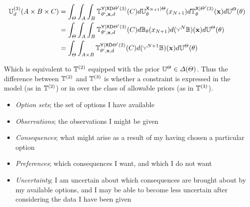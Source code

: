 \begin{align}
    \kernel{U}^{(3)}_d(A\times B\times C) &= \int_{\Theta} \int_A \int_{B}   \kernel{T}_{\theta',\mathbf{x},d}^{\RV{Y}|\RV{X}\RV{D}\Theta'(3)} (C) d\kernel{U}^{\RV{X}_{N+1}|\Theta}_\theta(x_{N+1}) d\kernel{T}_{\theta}^{\RV{X}|\Theta'(3)}(\mathbf{x}) d\kernel{U}^{\Theta}(\theta)\\
                                  &= \int_{\Theta} \int_A \int_{B}  \kernel{T}_{\theta',\mathbf{x},d}^{\RV{Y}|\RV{X}\RV{D}\Theta'(3)} (C) d\kernel{B}_\theta(x_{N+1}) d\kernel(\splitter{0.1}^{N}\kernel{B})(\mathbf{x}) d\kernel{U}^{\Theta}(\theta)\\
                                  &= \int_{\Theta} \int_{A\times B}  \kernel{T}_{\theta',\mathbf{x},d}^{\RV{Y}|\RV{X}\RV{D}\Theta'(2)} (C) d\kernel(\splitter{0.1}^{N+1}\kernel{B})(\mathbf{x}) d\kernel{U}^{\Theta}(\theta)\\
\end{align}

Which is equivalent to $\mathbb{T}^{(2)}$ equipped with the prior $\mathbb{U}^{\Theta}\in \Delta(\Theta)$. Thus the difference between $\mathbb{T}^{(2)}$ and $\mathbb{T}^{(3)}$ is whether a constraint is expressed in the model (as in $\mathbb{T}^{(2)}$) or in over the class of allowable priors (as in $\mathbb{T}^{(3)}$).







\begin{itemize}
    \item \emph{Option sets}; the set of options I have available
    \item \emph{Observations}; the observations I might be given
    \item \emph{Consequences}; what might arise as a result of my having chosen a particular option
    \item \emph{Preferences}; which consequences I want, and which I do not want
    \item \emph{Uncertainty}; I am uncertain about which consequences are brought about by my available options, and I may be able to become less uncertain after considering the data I have been given
\end{itemize}

